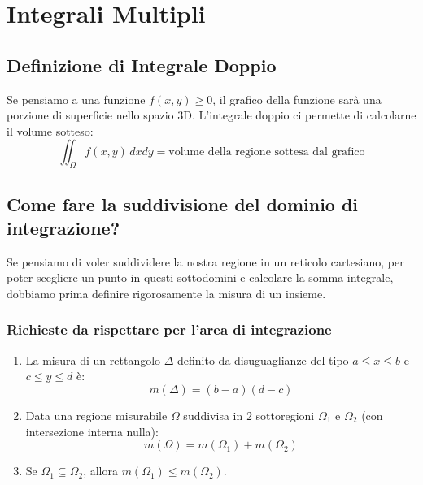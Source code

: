 \chapter{Integrali Multipli}

\section{Definizione di Integrale Doppio}
Se pensiamo a una funzione $f(x,y) \ge 0$, il grafico della funzione sarà una porzione di superficie nello spazio 3D. 
L'integrale doppio ci permette di calcolarne il volume sotteso:
\[ \iint_\Omega f(x,y) \, dx dy = \text{volume della regione sottesa dal grafico} \]

\section{Come fare la suddivisione del dominio di integrazione?}
Se pensiamo di voler suddividere la nostra regione in un reticolo cartesiano, per poter scegliere un punto in questi sottodomini e calcolare la somma integrale, dobbiamo prima definire rigorosamente la misura di un insieme.

\subsection{Richieste da rispettare per l'area di integrazione}
\begin{enumerate}
    \item La misura di un rettangolo $\Delta$ definito da disuguaglianze del tipo $a \le x \le b$ e $c \le y \le d$ è:
    \[ m(\Delta) = (b-a)(d-c) \]
    
    \begin{center}
    \end{center}

    \item Data una regione misurabile $\Omega$ suddivisa in 2 sottoregioni $\Omega_1$ e $\Omega_2$ (con intersezione interna nulla):
    \[ m(\Omega) = m(\Omega_1) + m(\Omega_2) \]

    \item Se $\Omega_1 \subseteq \Omega_2$, allora $m(\Omega_1) \le m(\Omega_2)$.
\end{enumerate}


